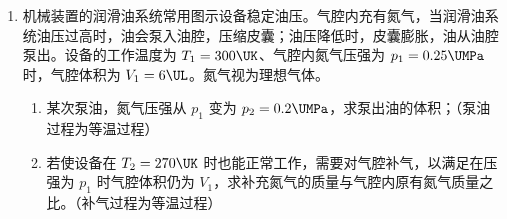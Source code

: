 \documentclass[\gkver]{gaokaozhenti}
\begin{document}
\begin{enumerate}
{（2）AB．充电电流 $i_{C}$ 初始最大，逐渐衰减到 0（方向为正），故 A 正确，B 错误；CD．电容器电压 $u_{C}$ 从 0 逐渐升高，最终稳定在两端的分压值 $R_{2}$，故 C 错误，D 正确。

故选 AD。

（3）根据题图可得斜率的绝对值 $|k_{1}|=\frac{0-2.0}{0-(-0.2)}\UO=10.0\UO$

放电时，电容器仅通过 $R_{2}$ 放电，即其对应于 $R_{2}$ 的阻值。

（4）充电时，有 $E=i_{1}R_{1}+u_{C}$

又 $i_{1}=i_{2}+i_{C}$，

$i_{2}=\frac{u_{C}}{R_{2}}$

联立可得 $u_{C}=-\frac{R_{1}R_{2}}{R_{1}+R_{2}}i_{C}+\frac{ER_{2}}{R_{1}+R_{2}}$

与 $u_{C}=k_{2}i_{C}+b$ 对比可知 $k_{2}=-\frac{R_{1}R_{2}}{R_{1}+R_{2}}$，$b=\frac{ER_{2}}{R_{1}+R_{2}}$

根据题图可得 $-\frac{R_{1}R_{2}}{R_{1}+R_{2}}=\frac{0.8-2.7}{1.0-0.08}$，$\frac{ER_{2}}{R_{1}+R_{2}}=2.9$

解得 $E\approx3.55\UV$
}

\item
机械装置的润滑油系统常用图示设备稳定油压。气腔内充有氮气，当润滑油系统油压过高时，油会泵入油腔，压缩皮囊；油压降低时，皮囊膨胀，油从油腔泵出。设备的工作温度为 $T_{1}=300\UK$、气腔内氮气压强为 $p_{1}=0.25\UMPa$ 时，气腔体积为 $V_{1}=6\UL$。氮气视为理想气体。
\begin{enumerate}
	\item
	某次泵油，氮气压强从 $p_{1}$ 变为 $p_{2}=0.2\UMPa$，求泵出油的体积；（泵油过程为等温过程）
	\item
	若使设备在 $T_{2}=270\UK$ 时也能正常工作，需要对气腔补气，以满足在压强为 $p_{1}$ 时气腔体积仍为 $V_{1}$，求补充氮气的质量与气腔内原有氮气质量之比。（补气过程为等温过程）
\end{enumerate}
\onepicture[align=right, w=3.86cm]{}

\end{enumerate}
\end{document}

